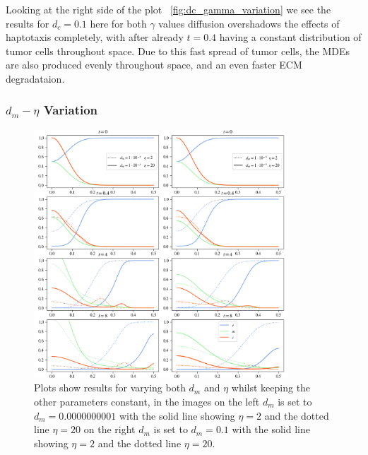 Looking at the right side of the plot ~\ref{fig:dc_gamma_variation} we see the results for $d_c=0.1$ here for both $\gamma$ values diffusion overshadows the effects of haptotaxis completely, with after already $t=0.4$ having a constant distribution of tumor cells throughout space. Due to this fast spread of tumor cells, the MDEs are also produced evenly throughout space, and an even faster ECM degradataion. 

\subsubsection*{$d_m - \eta$ Variation}
\begin{figure}[h]
    \centering
    \includegraphics[width=0.85\textwidth]{resources/images/dm_eta_variation.png}
    \caption{Plots show results for varying both $d_m$ and $\eta$ whilst keeping the other parameters constant, in the images on the left $d_m$ is set to $d_m=0.0000000001$ with the solid line showing $\eta = 2$ and the dotted line $\eta=20$ on the right $d_m$ is set to $d_m=0.1$ with the solid line showing $\eta = 2$ and the dotted line $\eta=20$.}
    \label{fig:dm_eta_variation}
\end{figure}

